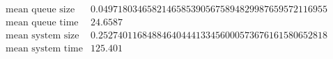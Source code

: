 \[\begin{array}{cc}
 \text{mean queue size} & 0.04971803465821465853905675894829987659572116955 \\
 \text{mean queue time} & 24.6587 \\
 \text{mean system size} & 0.25274011684884640444133456000573676161580652818 \\
 \text{mean system time} & 125.401 \\
\end{array}\]


